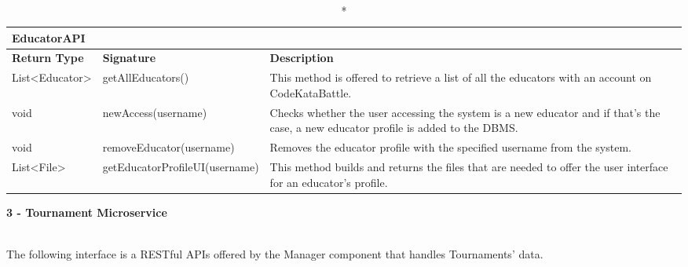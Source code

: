\begin{longtable}{|p{2.5cm} p{6.5cm} p{4.5cm}|}
	\caption*{EducatorAPI}\\ 
	
	\hline
	\textbf{Return Type} & \textbf{Signature} & \textbf{Description}\\
	\hline \endhead
	
	List\textless Educator\textgreater & getAllEducators() & This method is offered to retrieve a list of all the educators with an account on CodeKataBattle.\\
	
	void & newAccess(username) & Checks whether the user accessing the system is a new educator and if that's the case, a new educator profile is added to the DBMS. \\
	
	void & removeEducator(username) & Removes the educator profile with the specified username from the system.\\
	
	List\textless File\textgreater & getEducatorProfileUI(username) & This method builds and returns the files that are needed to offer the user interface for an educator's profile.\\
	\hline
	
\end{longtable}

\pagebreak

	\begin{large}{\textbf{3 - Tournament Microservice}}\end{large}\\
	The following interface is a RESTful APIs offered by the Manager component that handles Tournaments' data.
	
